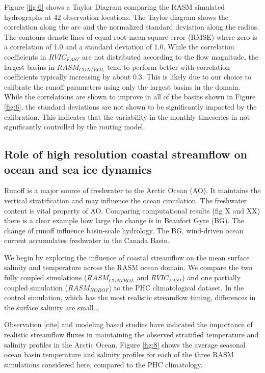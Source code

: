 \documentclass[jgrga, draft]{agutex}
\begin{document}
\begin{article}
Figure \ref{fig:6} shows a Taylor Diagram comparing the RASM simulated hydrographs at 42 observation locations.
The Taylor diagram shows the correlation along the arc and the normalized standard deviation along the radius.
The contours denote lines of equal root-mean-square error (RMSE) where zero is a correlation of 1.0 and a standard deviation of 1.0.
While the correlation coefficients in $RVIC_{FAST}$ are not distributed according to the flow magnitude, the largest basins in $RASM_{CONTROL}$ tend to perform better with correlation coefficients typically increasing by about 0.3.
This is likely due to our choice to calibrate the runoff parameters using only the largest basins in the domain.
While the correlations are shown to improve in all of the basins shown in Figure \ref{fig:6}, the standard deviations are not shown to be significantly impacted by the calibration.
This indicates that the variability in the monthly timeseries in not significantly controlled by the routing model.

\subsection{Role of high resolution coastal streamflow on ocean and sea ice dynamics}
Runoff is a major source of freshwater to the Arctic Ocean (AO). It maintains the vertical stratification and may influence the ocean circulation.
The freshwater content is vital property of AO.
Comparing computational results (fig X and XX) there is a clear example how large the change is in Beaufort Gyre (BG).
The change of runoff influence basin-scale hydrology.
The BG, wind-driven ocean current accumulates freshwater in the Canada Basin.

We begin by exploring the influence of coastal streamflow on the mean surface salinity and temperature across the RASM ocean domain.
We compare the two fully coupled simulations ($RASM_{CONTROL}$ and $RVIC_{FAST}$) and one partially coupled simulation ($RASM_{NOROF}$) to the PHC climatological dataset.
In the control simulation, which has the most realistic streamflow timing, differences in the surface salinity are small...

Observation [cite] and modeling \citep[e.g.][]{Nummelin_2015} based studies have indicated the importance of realistic streamflow fluxes in maintaining the observed stratified temperature and salinity profiles in the Arctic Ocean.
Figure \ref{fig:8} shows the average seasonal ocean basin temperature and salinity profiles for each of the three RASM simulations considered here, compared to the PHC climatology.


\end{article}
\end{document}
